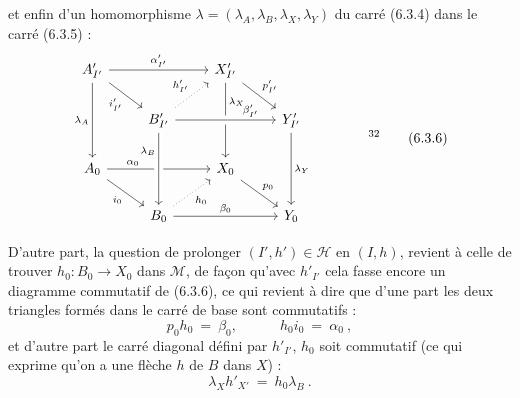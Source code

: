 \documentclass[11pt]{article}
\newcommand{\printedpage}[1]{\marginpar{\footnotesize p.~#1}}
\newcommand{\msp}[1]{\marginpar{\footnotesize [#1]}}
\begin{document}
et enfin d'un homomorphisme $\lambda = (\lambda_A, \lambda_B, \lambda_X, \lambda_Y)$ du carré (6.3.4) dans le carré (6.3.5) :
\printedpage{56}\msp{page 112}
\[
\begin{tikzcd}
A'_{I'} \arrow[rr, "\alpha'_{I'}"] \arrow[dr, "i'_{I'}"'] \arrow[dd, "\lambda_A"'] & & X'_{I'} \arrow[dr, "p'_{I'}"] \arrow[dd, "\lambda_X" near start] & \\
 & B'_{I'} \arrow[ur, dotted, "h'_{I'}"] \arrow[rr, crossing over, "\beta'_{I'}" near end] & & Y'_{I'} \arrow[dd, "\lambda_Y"] \\
A_0 \arrow[rr, "\alpha_0" near start] \arrow[dr, "i_0"'] & & X_0 \arrow[dr, "p_0"] & \\
 & B_0 \arrow[from=2-2, crossing over, "\lambda_B"' near start] \arrow[ur, dotted, "h_0"'] \arrow[rr, "\beta_0"] & & Y_0
\end{tikzcd}
\qquad\qquad \text{\footnotemark[32]}
\tag*{(6.3.6)}
\]

D'autre part, la question de prolonger $(I', h') \in \mathcal{H}$ en $(I, h)$, revient à celle de trouver $h_0 : B_0 \longrightarrow X_0$ dans $\mathcal{M}$, de façon qu'avec $h'_{I'}$ cela fasse encore un diagramme commutatif de (6.3.6), ce qui revient à dire que d'une part les deux triangles formés dans le carré de base sont commutatifs :
\[
p_0h_0 \ =\ \beta_0, \qquad\quad h_0i_0 \ =\ \alpha_0\ ,
\tag*{(6.3.7)}
\]
et d'autre part le carré diagonal défini par $h'_{I'}$, $h_0$ soit commutatif (ce qui exprime qu'on a une flèche $h$ de $B$ dans $X$) :
\[
\lambda_X h'_{X'} \ =\ h_0\lambda_B\ . %
\tag*{(6.3.8)}
\]
\end{document}
